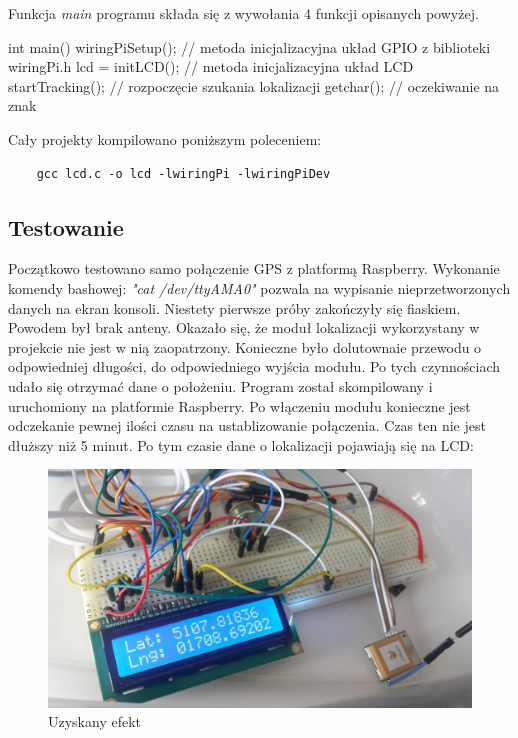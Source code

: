 \documentclass{article}
\begin{document}
	Funkcja \textit{main} programu składa się z wywołania 4 funkcji opisanych powyżej.
	\begin{verbatimtab}
int main()
{
	wiringPiSetup(); // metoda inicjalizacyjna układ GPIO z biblioteki wiringPi.h  
	lcd = initLCD(); // metoda inicjalizacyjna układ LCD 
	startTracking(); // rozpoczęcie szukania lokalizacji
	getchar(); // oczekiwanie na znak 
}

	\end{verbatimtab}
	
	Cały projekty kompilowano poniższym poleceniem:
	\begin{verbatim}
	gcc lcd.c -o lcd -lwiringPi -lwiringPiDev
	\end{verbatim}
	\subsection{Testowanie}	
	Początkowo testowano samo połączenie GPS z platformą Raspberry. Wykonanie komendy bashowej:
	\textit{"cat /dev/ttyAMA0"}
	pozwala na wypisanie nieprzetworzonych danych na ekran konsoli. Niestety pierwsze próby zakończyły się fiaskiem. Powodem był brak anteny. Okazało się, że moduł lokalizacji wykorzystany w projekcie nie jest w nią zaopatrzony. Konieczne było dolutownaie przewodu o odpowiedniej długości, do odpowiedniego wyjścia modułu. Po tych czynnościach udało się otrzymać dane o położeniu.
	Program został skompilowany i uruchomiony na platformie Raspberry. Po włączeniu modułu konieczne jest odczekanie pewnej ilości czasu na ustablizowanie połączenia. Czas ten nie jest dłuższy niż 5 minut. Po tym czasie dane o lokalizacji pojawiają się na LCD:
	
		\begin{figure}[H]
		\centering
		\includegraphics[width=0.9\linewidth]{efekt1.jpg}
		\caption{Uzyskany efekt}
		\end{figure}
\end{document}

